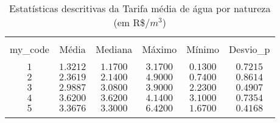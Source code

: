 \begin{table}[H] \centering 
	\begin{minipage}{0.7\textwidth}
  \caption{Estatísticas descritivas da Tarifa média de água por natureza (em R\$/$m^{3}$) } 
  \label{tab:in005} 
\begin{tabular}{@{\extracolsep{5pt}} cccccc} 
\\[-1.8ex]\hline 
\hline \\[-1.8ex] 
my\_code & Média & Mediana & Máximo & Mínimo & Desvio\_p \\ 
\hline \\[-1.8ex] 
$1$ & $1.3212$ & $1.1700$ & $3.1700$ & $0.1300$ & $0.7215$ \\ 
$2$ & $2.3619$ & $2.1400$ & $4.9000$ & $0.7400$ & $0.8614$ \\ 
$3$ & $2.9887$ & $3.0800$ & $3.9000$ & $2.2300$ & $0.4907$ \\ 
$4$ & $3.6200$ & $3.6200$ & $4.1400$ & $3.1000$ & $0.7354$ \\ 
$5$ & $3.3676$ & $3.3000$ & $6.4200$ & $1.6700$ & $0.4168$ \\ 
\hline \\[-1.8ex] 
\end{tabular} 
	\end{minipage}
\end{table} 